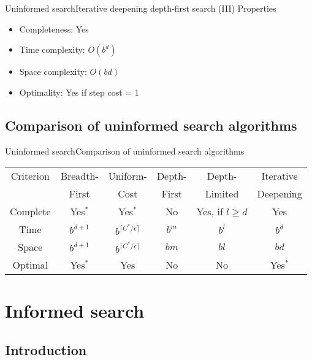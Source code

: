 \documentclass[10pt,compress]{beamer} %
\begin{document}
\begin{frame}{Uninformed search}{Iterative deepening depth-first search (III)}
      Properties
      \begin{itemize}
        \item Completeness: Yes
        \item Time complexity: $O(b^{d})$
        \item Space complexity: $O(bd)$
        \item Optimality: Yes if step cost = 1
      \end{itemize}
\end{frame}


\subsection{Comparison of uninformed search algorithms}

\begin{frame}{Uninformed search}{Comparison of uninformed search algorithms}

\begin{tabular}{cccccc}
\hline
Criterion & Breadth- & Uniform- & Depth- & Depth- & Iterative \\
          & First &  Cost & First & Limited & Deepening \\
\hline
Complete  & Yes$^*$ & Yes$^*$ & No & Yes, if $l \ge d$ & Yes \\
Time      & $b^{d+1}$ & $b^{\lceil C^*/\epsilon \rceil}$ & $b^m$ & $b^l$ & $b^d$ \\
Space     & $b^{d+1}$ & $b^{\lceil C^*/\epsilon \rceil}$ & $bm$ & $bl$ & $bd$ \\
Optimal   & Yes$^*$ & Yes & No & No & Yes$^*$ \\
\hline
\end{tabular}

\end{frame}


\section{Informed search}
\subsection{Introduction}
\end{document}
